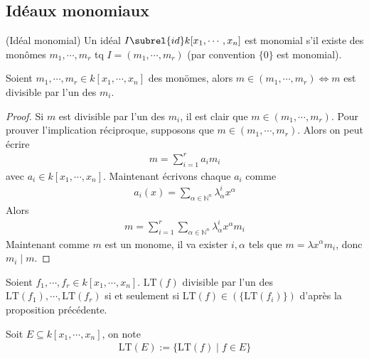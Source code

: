         \subsection{Idéaux monomiaux}
            \begin{defi} (Idéal monomial)
                Un idéal $I \subrel{id} k[x_1, \cdots, x_n]$ est monomial s'il existe des monômes $m_1, \cdots, m_r$ tq $I = (m_1, \cdots, m_r)$ (par convention $\{0\}$ est monomial).
            \end{defi}
            \begin{prop}
                \label{lemme_nul}
                Soient $m_1, \cdots, m_r \in k[x_1, \cdots, x_n]$ des monömes, alors $m \in (m_1, \cdots, m_r) \iff m$ est divisible par l'un des $m_i$.
            \end{prop}
            \begin{proof}
                Si $m$ est divisible par l'un des $m_i$, il est clair que $m \in (m_1, \cdots, m_r)$. Pour prouver l'implication réciproque, supposons que $m \in (m_1, \cdots, m_r)$. Alors on peut écrire
                \begin{align*}
                    m = \sum_{i = 1}^r a_i m_i
                \end{align*}
                avec $a_i \in k[x_1, \cdots, x_n]$. Maintenant écrivons chaque $a_i$ comme
                \begin{align*}
                    a_i(x) = \sum_{\alpha \in \mathbb{N}^n} \lambda_\alpha^i x^{\alpha}
                \end{align*}
                Alors
                \begin{align*}
                    m = \sum_{i = 1}^r \sum_{\alpha \in \mathbb{N}^n} \lambda_\alpha^i x^{\alpha} m_i
                \end{align*}
                Maintenant comme $m$ est un monome, il va exister $i, \alpha$ tels que $m = \lambda x^\alpha m_i$, donc $m_i \mid m$.
            \end{proof}
            Soient $f_1, \cdots, f_r \in k[x_1, \cdots, x_n]$. $\mathrm{LT}(f)$ divisible par l'un des $\mathrm{LT}(f_1), \cdots, \mathrm{LT}(f_r)$ si et seulement si $\mathrm{LT}(f) \in (\{\mathrm{LT}(f_i)\})$ d'après la proposition précédente. \\
            \begin{nota}
                Soit $E \subseteq k[x_1, \cdots, x_n]$, on note
                \begin{align*}
                    \mathrm{LT}(E) := \{\mathrm{LT}(f) \mid f \in E\}
                \end{align*}
            \end{nota}
